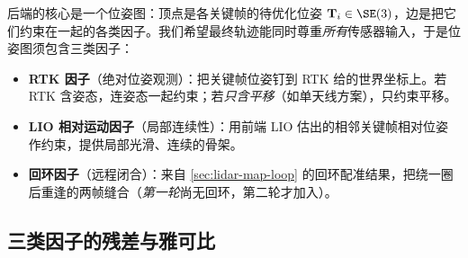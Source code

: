 后端的核心是一个位姿图：顶点是各关键帧的待优化位姿 $\mathbf{T}_i\in\SE(3)$，边是把它们约束在一起的各类因子。我们希望最终轨迹能同时尊重\emph{所有}传感器输入，于是位姿图须包含三类因子\cite{gao2023slamad}：

\begin{itemize}
  \item \textbf{RTK 因子}（绝对位姿观测）：把关键帧位姿钉到 RTK 给的世界坐标上。若 RTK 含姿态，连姿态一起约束；若\emph{只含平移}（如单天线方案），只约束平移。
  \item \textbf{LIO 相对运动因子}（局部连续性）：用前端 LIO 估出的相邻关键帧相对位姿作约束，提供局部光滑、连续的骨架。
  \item \textbf{回环因子}（远程闭合）：来自 \cref{sec:lidar-map-loop} 的回环配准结果，把绕一圈后重逢的两帧缝合（\emph{第一轮}尚无回环，第二轮才加入）。
\end{itemize}

\subsection{三类因子的残差与雅可比}
\label{sec:lidar-map-factors}

